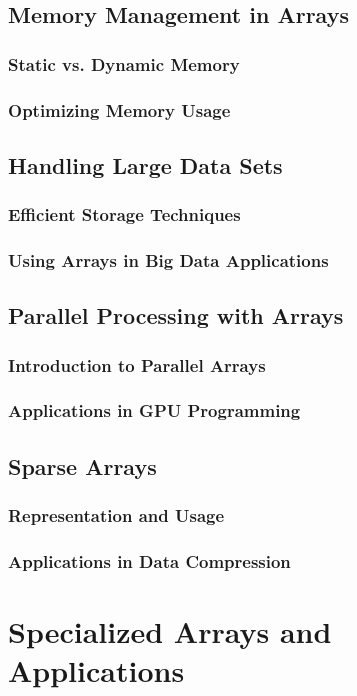 \documentclass{book}
\begin{document}
	\section{Memory Management in Arrays}
	\subsection{Static vs. Dynamic Memory}
	\subsection{Optimizing Memory Usage}
	
	\section{Handling Large Data Sets}
	\subsection{Efficient Storage Techniques}
	\subsection{Using Arrays in Big Data Applications}
	
	\section{Parallel Processing with Arrays}
	\subsection{Introduction to Parallel Arrays}
	\subsection{Applications in GPU Programming}
	
	\section{Sparse Arrays}
	\subsection{Representation and Usage}
	\subsection{Applications in Data Compression}
	
	\chapter{Specialized Arrays and Applications}
\end{document}

